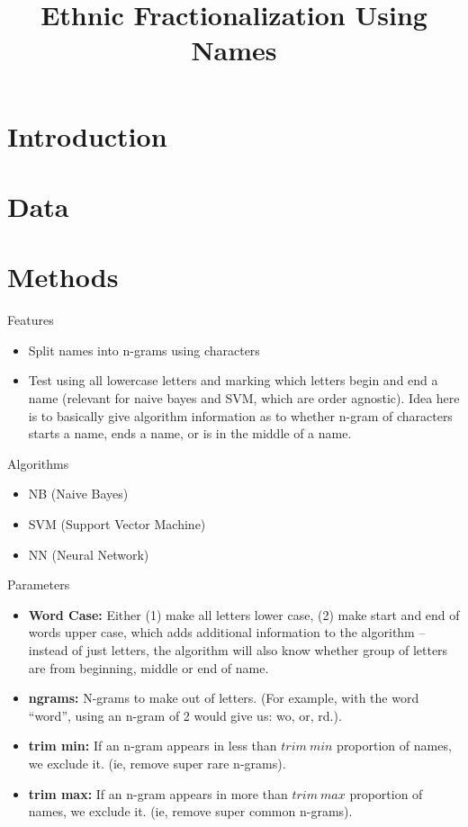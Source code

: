 \documentclass[11pt, oneside]{article}
\title{Ethnic Fractionalization Using Names}
\author{}
\date{}
\begin{document}
\maketitle

\section{Introduction}

\section{Data}

\section{Methods}

\noindent Features
\begin{itemize}
\item Split names into n-grams using characters
\item Test using all lowercase letters and marking which letters begin and end a name (relevant for naive bayes and SVM, which are order agnostic). Idea here is to basically give algorithm information as to whether n-gram of characters starts a name, ends a name, or is in the middle of a name.
\end{itemize}

\noindent Algorithms
\begin{itemize}
\item NB (Naive Bayes)
\item SVM (Support Vector Machine)
\item NN (Neural Network)
\end{itemize}

\noindent Parameters
\begin{itemize}
\item {\bf Word Case:} Either (1) make all letters lower case, (2) make start and end of words upper case, which adds additional information to the algorithm -- instead of just letters, the algorithm will also know whether group of letters are from beginning, middle or end of name.
\item {\bf ngrams:} N-grams to make out of letters. (For example, with the word ``word'', using an n-gram of 2 would give us: wo, or, rd.).
\item {\bf trim min:} If an n-gram appears in less than $trim~min$ proportion of names, we exclude it. (ie, remove super rare n-grams).
\item {\bf trim max:} If an n-gram appears in more than $trim~max$ proportion of names, we exclude it. (ie, remove super common n-grams).
\end{itemize}
\end{document}
